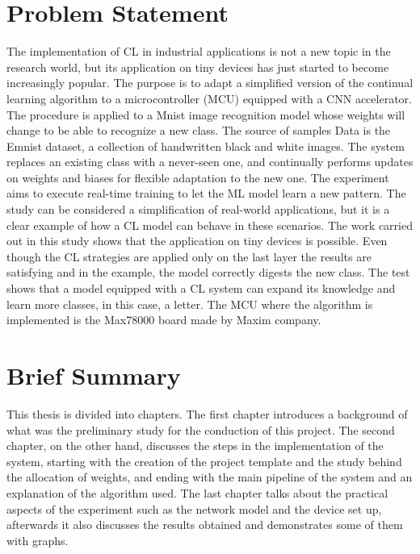 \section{Problem Statement}
\label{sec:problem_statement}
\quad The implementation of CL in industrial applications is not a new topic in the research world, but its application on tiny devices has just started to become increasingly popular. The purpose is to adapt a simplified version of the continual learning algorithm to a microcontroller (MCU) equipped with a CNN accelerator. The procedure is applied to a Mnist image recognition model whose weights will change to be able to recognize a new class. The source of samples Data is the Emnist dataset, a collection of handwritten black and white images. The system replaces an existing class with a never-seen one, and continually performs updates on weights and biases for flexible adaptation to the new one. The experiment aims to execute real-time training to let the ML model learn a new pattern. The study can be considered a simplification of real-world applications, but it is a clear example of how a CL model can behave in these scenarios. The work carried out in this study shows that the application on tiny devices is possible. Even though the CL strategies are applied only on the last layer the results are satisfying and in the example, the model correctly digests the new class. The test shows that a model equipped with a CL system can expand its knowledge and learn more classes, in this case, a letter.
The MCU where the algorithm is implemented is the Max78000 board made by Maxim company.  

\section{Brief Summary}
\label{sec:brief_summary}

\quad This thesis is divided into chapters. The first chapter introduces a background of what was the preliminary study for the conduction of this project. The second chapter, on the other hand, discusses the steps in the implementation of the system, starting with the creation of the project template and the study behind the allocation of weights, and ending with the main pipeline of the system and an explanation of the algorithm used. The last chapter talks about the practical aspects of the experiment such as the network model and the device set up, afterwards it also discusses the results obtained and demonstrates some of them with graphs.

\clearpage
\newpage
\mbox{~}
\clearpage
\newpage